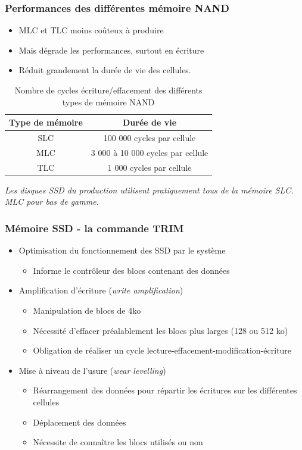 \begin{frame}
\frametitle{Performances des différentes mémoire NAND}
\begin{itemize}
\item MLC et TLC moins coûteux à produire
\item Mais dégrade les performances, surtout en écriture
\item Réduit grandement la durée de vie des cellules.
\end{itemize}

\begin{table}[htdp]
\caption{Nombre de cycles écriture/effacement des différents types de mémoire NAND}
\begin{center}
\begin{tabular}{c|c}
Type de mémoire & Durée de vie \\
\hline
SLC & 100 000 cycles par cellule \\
MLC &  3 000 à 10 000 cycles par cellule \\
TLC & 1 000 cycles par cellule \\
\end{tabular}
\end{center}
\label{default}
\end{table}
\textit{Les disques SSD du production utilisent pratiquement tous de la mémoire SLC. MLC pour bas de gamme.}
\end{frame}

\begin{frame}
\frametitle{Mémoire SSD - la commande TRIM}
\begin{itemize}
\item Optimisation du fonctionnement des SSD par le système
\begin{itemize}
\item Informe le contrôleur des blocs contenant des données
\end{itemize}

\item Amplification d’écriture (\textit{write amplification})
\begin{itemize}
\item Manipulation de blocs de 4ko
\item Nécessité d'effacer préalablement les blocs plus larges (128 ou 512 ko)
\item Obligation de réaliser un cycle lecture-effacement-modification-écriture
\end{itemize}

\item Mise à niveau de l’usure (\textit{wear levelling})
\begin{itemize}
\item Réarrangement des données pour répartir les écritures sur les différentes cellules
\item Déplacement des données 
\item Nécessite de connaître les blocs utilisés ou non
\end{itemize}

\end{itemize}

\end{frame}

